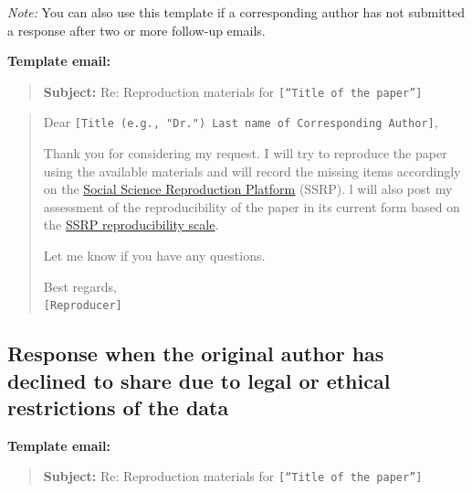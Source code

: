 \documentclass[
]{book}
\begin{document}
\emph{Note:} You can also use this template if a corresponding author has not submitted a response after two or more follow-up emails.

\textbf{Template email:}

\begin{quote}
\textbf{Subject:} Re: Reproduction materials for \texttt{{[}“Title\ of\ the\ paper”{]}}
\end{quote}

\begin{quote}
Dear \texttt{{[}Title\ (e.g.,\ "Dr.")\ Last\ name\ of\ Corresponding\ Author{]}},

Thank you for considering my request. I will try to reproduce the paper using the available materials and will record the missing items accordingly on the \href{https://www.socialsciencereproduction.org/}{Social Science Reproduction Platform} (SSRP). l will also post my assessment of the reproducibility of the paper in its current form based on the \href{https://bitss.github.io/ACRE/assessment.html\#levels-of-computational-reproducibility-for-a-specific-output}{SSRP reproducibility scale}.

Let me know if you have any questions.

Best regards,\\
\texttt{{[}Reproducer{]}}
\end{quote}

\hypertarget{response-when-the-original-author-has-declined-to-share-due-to-legal-or-ethical-restrictions-of-the-data}{%
\subsection{Response when the original author has declined to share due to legal or ethical restrictions of the data}\label{response-when-the-original-author-has-declined-to-share-due-to-legal-or-ethical-restrictions-of-the-data}}

\textbf{Template email:}

\begin{quote}
\textbf{Subject:} Re: Reproduction materials for \texttt{{[}“Title\ of\ the\ paper”{]}}
\end{quote}
\end{document}
